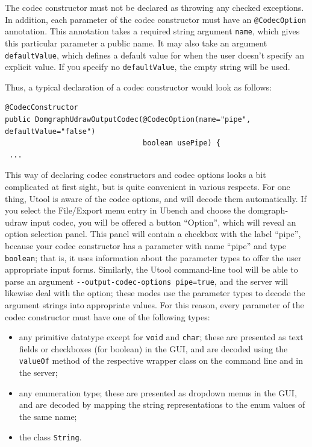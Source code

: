 The codec constructor
must not be declared as throwing any checked exceptions. In addition, each parameter
of the codec constructor must have an \verb?@CodecOption? annotation. This annotation
takes a required string argument \verb?name?, which gives this particular parameter
a public name. It may also take an argument \verb?defaultValue?, which defines a default value
for when the user doesn't specify an explicit value. If you specify no \verb?defaultValue?, the
empty string will be used.

Thus, a typical declaration of a codec constructor would look as follows:

\begin{verbatim}
@CodecConstructor
public DomgraphUdrawOutputCodec(@CodecOption(name="pipe", defaultValue="false") 
                                boolean usePipe) {
 ...
\end{verbatim}
 
This way of declaring codec constructors and codec options looks a bit complicated
at first sight, but is quite convenient in various respects. For one thing, Utool
is aware of the codec options, and will decode them automatically. If you select
the File/Export menu entry in Ubench and choose the domgraph-udraw input codec, you
will be offered a button ``Option'', which will reveal an option selection panel.
This panel will contain a checkbox with the label ``pipe'', because your
codec constructor has a parameter with name ``pipe'' and type \verb?boolean?;
that is, it uses information about the parameter types to offer the user
appropriate input forms. 
Similarly, the Utool command-line tool will be able to parse an argument
\verb?--output-codec-options pipe=true?, and the server will likewise deal
with the option; these modes use the parameter types to decode the argument
strings into appropriate values. For this reason, every parameter of the
codec constructor must have one of the following types:

\begin{itemize}
\item any primitive datatype except for \verb?void? and \verb?char?; these are
presented as text fields or checkboxes (for boolean) in the GUI, and are decoded
using the \verb?valueOf? method of the respective wrapper class on the command
line and in the server;
\item any enumeration type; these are presented as dropdown menus in the GUI,
and are decoded by mapping the string representations to the enum values of the
same name;
\item the class \verb?String?.
\end{itemize}

